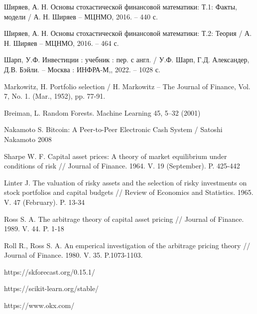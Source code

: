 \newpage
{}
\renewcommand{\bibsection}{\centering\textbf{\large СПИСОК ИСПОЛЬЗОВАННЫХ ИСТОЧНИКОВ}}



\begin{thebibliography}{99}
    Ширяев, А. Н. Основы стохастической финансовой математики: Т.1: Факты, модели / А. Н. Ширяев -- МЦНМО, 2016. -- 440 с.

    Ширяев, А. Н. Основы стохастической финансовой математики: Т.2: Теория / А. Н. Ширяев -- МЦНМО, 2016. -- 464 с.

    Шарп, У.Ф. Инвестиции : учебник : пер. с англ. / У.Ф. Шарп, Г.Д. Александер, Д.В. Бэйли. -- Москва : ИНФРА-М,, 2022. -- 1028 с.

    Markowitz, H. Portfolio selection / H. Markowitz -- The Journal of Finance, Vol. 7, No. 1. (Mar., 1952), pp. 77-91.

    Breiman, L. Random Forests. Machine Learning 45, 5–32 (2001)

    Nakamoto S. Bitcoin: A Peer-to-Peer Electronic Cash System / Satoshi Nakamoto 2008

    Sharpe W. F. Capital asset prices: A theory of market equilibrium under conditions of risk //
    Journal of Finance. 1964. V. 19 (September). P. 425-442
    
    Linter J. The valuation of risky assets and the selection of risky investments on stock portfolios and capital budgets //
    Review of Economics and Statistics. 1965. V. 47 (February). P. 13-34

    Ross S. A. The arbitrage theory of capital asset pricing //
    Journal of Finance. 1989. V. 44. P. 1-18

    Roll R., Ross S. A. An emperical investigation of the arbitrage pricing theory //
    Journal of Finance. 1980. V. 35. P.1073-1103.

    https://skforecast.org/0.15.1/

    https://scikit-learn.org/stable/
    
    https://www.okx.com/

\end{thebibliography}
